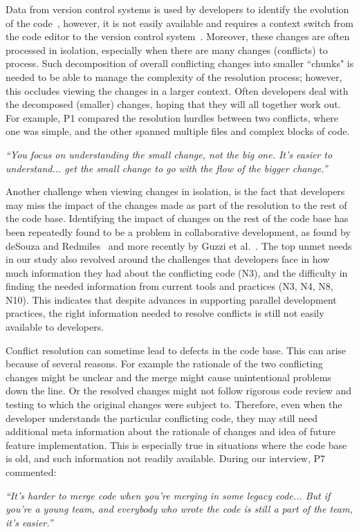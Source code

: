 Data from version control systems is used by developers to identify the evolution of the code~\cite{Mihai_lenses}, however, it is not easily available and requires a context switch from the code editor to the version control system~\cite{Guzzi2015}. 
Moreover, these changes are often processed in isolation, especially when there are many changes (conflicts) to process. 
Such decomposition of overall conflicting changes into smaller ``chunks" is needed to be able to manage the complexity of the resolution process; however, this occludes viewing the changes in a larger context. 
Often developers deal with the decomposed (smaller) changes, hoping that they will all together work out. 
For example, P1 compared the resolution hurdles between two conflicts, where one was simple, and the other spanned multiple files and complex blocks of code.
\begin{quoting}
\textit{``You focus on understanding the small change, not the big one. It's easier to understand... get the small change to go with the flow of the bigger change.''}
\end{quoting}

Another challenge when viewing changes in isolation, is the fact that developers may miss the impact of the changes made as part of the resolution to the rest of the code base. 
Identifying the impact of changes on the rest of the code base has been repeatedly found to be a problem in collaborative development, as found by deSouza and Redmiles~\cite{deSouza2008} and more recently by Guzzi et al.~\cite{Guzzi2015}. 
The top unmet needs in our study also revolved around the challenges that developers face in how much information they had about the conflicting code (N3), and the difficulty in finding the needed information from current tools and practices (N3, N4, N8, N10). 
This indicates that despite advances in supporting parallel development practices, the right information needed to resolve conflicts is still not easily available to developers. 

Conflict resolution can sometime lead to defects in the code base. This can arise because of several reasons. For example the rationale of the two conflicting changes might be unclear and the merge might cause unintentional problems down the line. Or the resolved changes might not follow rigorous code review and testing to which the original changes were subject to.
Therefore, even when the developer understands the particular conflicting code, they may still need additional meta information about the rationale of changes and idea of future feature implementation. This is especially true in situations where the code base is old, and such information not readily available. During our interview, P7 commented:
\begin{quoting}
\textit{``It's harder to merge code when you're merging in some legacy code... But if you're a young team, and everybody who wrote the code is still a part of the team, it's easier.''}
\end{quoting}

